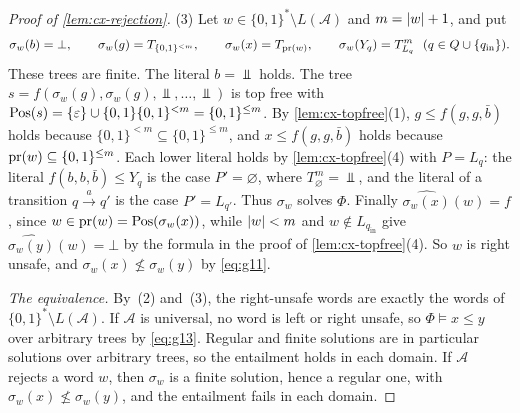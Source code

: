\begin{proof}[Proof of \cref{lem:cx-rejection}]
(3) Let $w\in\{0,1\}^*\setminus L(\mathcal A)$ and $m=\lvert w\rvert+1$, and put
\[
 \sigma_w(b)=\bot,\qquad \sigma_w(g)=T_{\{0,1\}^{<m}},\qquad
 \sigma_w(x)=T_{\operatorname{pr}(w)},\qquad \sigma_w(Y_q)=T_{L_q}^m\ \ (q\in Q\cup\{q_{\mathrm{in}}\}).
\]
These trees are finite. The literal $b=\Bot$ holds. The tree
$s=f(\sigma_w(g),\sigma_w(g),\Bot,\ldots,\Bot)$ is top free with
$\operatorname{Pos}(s)=\{\varepsilon\}\cup\{0,1\}\{0,1\}^{<m}=\{0,1\}^{\le m}$. By
\cref{lem:cx-topfree}(1), $g\le f(g,g,\bar b)$ holds because
$\{0,1\}^{<m}\subseteq\{0,1\}^{\le m}$, and $x\le f(g,g,\bar b)$ holds
because $\operatorname{pr}(w)\subseteq\{0,1\}^{\le m}$. Each lower literal holds by
\cref{lem:cx-topfree}(4) with $P=L_q$: the literal $f(b,b,\bar b)\le Y_q$
is the case $P'=\varnothing$, where $T_\varnothing^m=\Bot$, and the literal
of a transition $q\xrightarrow{a}q'$ is the case $P'=L_{q'}$. Thus
$\sigma_w$ solves $\Phi$. Finally $\widehat{\sigma_w(x)}(w)=f$, since
$w\in\operatorname{pr}(w)=\operatorname{Pos}(\sigma_w(x))$, while $\lvert w\rvert<m$ and
$w\notin L_{q_{\mathrm{in}}}$ give $\widehat{\sigma_w(y)}(w)=\bot$ by the
formula in the proof of \cref{lem:cx-topfree}(4). So $w$ is right unsafe,
and $\sigma_w(x)\not\le\sigma_w(y)$ by \eqref{eq:g11}.

\emph{The equivalence.} By~(2) and~(3), the right-unsafe words are exactly
the words of $\{0,1\}^*\setminus L(\mathcal A)$. If $\mathcal A$ is
universal, no word is left or right unsafe, so $\Phi\models x\le y$ over
arbitrary trees by \eqref{eq:g13}. Regular and finite solutions are in
particular solutions over arbitrary trees, so the entailment holds in each
domain. If $\mathcal A$ rejects a word $w$, then $\sigma_w$ is a finite
solution, hence a regular one, with $\sigma_w(x)\not\le\sigma_w(y)$, and the
entailment fails in each domain.
\end{proof}
